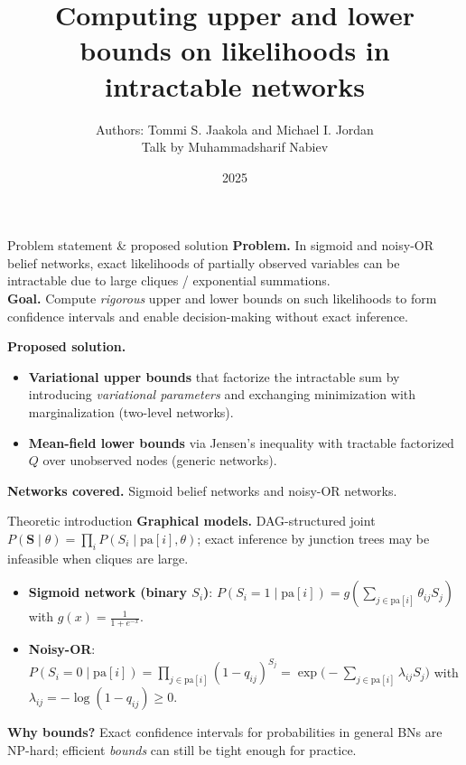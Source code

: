 \documentclass[10pt]{beamer}
\title{Computing upper and lower bounds on likelihoods in intractable networks}
\author{
Authors: Tommi S. Jaakola and Michael I. Jordan\\ 
\small Talk by Muhammadsharif Nabiev
}
\institute{Moscow Institute of Physics and Technology}
\date{2025}
\begin{document}
\begin{frame}
  \titlepage
\end{frame}

\begin{frame}{Problem statement \& proposed solution}
\textbf{Problem.} In sigmoid and noisy-OR belief networks, exact likelihoods of partially observed variables can be intractable due to large cliques / exponential summations. \\
\medskip
\textbf{Goal.} Compute \emph{rigorous} upper and lower bounds on such likelihoods to form confidence intervals and enable decision-making without exact inference.

\textbf{Proposed solution.}
\begin{itemize}
  \item \textbf{Variational upper bounds} that factorize the intractable sum by introducing \emph{variational parameters} and exchanging minimization with marginalization (two-level networks).
  \item \textbf{Mean-field lower bounds} via Jensen’s inequality with tractable factorized $Q$ over unobserved nodes (generic networks).
\end{itemize}

\textbf{Networks covered.} Sigmoid belief networks and noisy-OR networks.
\end{frame}

\begin{frame}{Theoretic introduction}
\textbf{Graphical models.} DAG-structured joint $P(\mathbf{S}\mid\theta)=\prod_i P(S_i\mid \mathrm{pa}[i],\theta)$; exact inference by junction trees may be infeasible when cliques are large.

\begin{itemize}
  \item \textbf{Sigmoid network (binary $S_i$)}: 
  $P(S_i\!=\!1\mid \mathrm{pa}[i])=g\!\left(\sum_{j\in \mathrm{pa}[i]} \theta_{ij} S_j\right)$ with $g(x)=\tfrac{1}{1+e^{-x}}$.
  \item \textbf{Noisy-OR}: 
  $P(S_i\!=\!0\mid \mathrm{pa}[i])=\prod_{j\in\mathrm{pa}[i]} (1-q_{ij})^{S_j}
  = \exp\!\Big(-\sum_{j\in\mathrm{pa}[i]} \lambda_{ij} S_j\Big)$
  with $\lambda_{ij}=-\log(1-q_{ij})\ge 0$.
\end{itemize}

\textbf{Why bounds?} Exact confidence intervals for probabilities in general BNs are NP-hard; efficient \emph{bounds} can still be tight enough for practice.
\end{frame}
\end{document}
